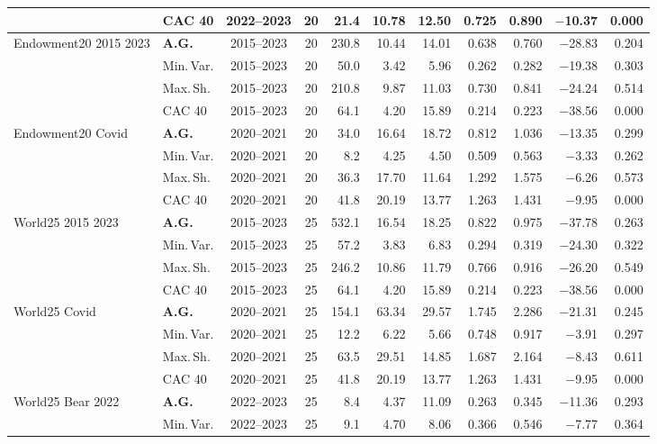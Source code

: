 \begin{longtable}{p{2.6cm} l c c r r r r r r r}
 & CAC 40 & 2022--2023 & 20 & 21.4 & 10.78 & 12.50 & 0.725 & 0.890 & $-$10.37 & 0.000 \\
\midrule
Endowment20 2015 2023 & \textbf{A.G.} & 2015--2023 & 20 & 230.8 & 10.44 & 14.01 & 0.638 & 0.760 & $-$28.83 & 0.204 \\
 & Min.\,Var. & 2015--2023 & 20 & 50.0 & 3.42 & 5.96 & 0.262 & 0.282 & $-$19.38 & 0.303 \\
 & Max.\,Sh. & 2015--2023 & 20 & 210.8 & 9.87 & 11.03 & 0.730 & 0.841 & $-$24.24 & 0.514 \\
 & CAC 40 & 2015--2023 & 20 & 64.1 & 4.20 & 15.89 & 0.214 & 0.223 & $-$38.56 & 0.000 \\
\midrule
Endowment20 Covid & \textbf{A.G.} & 2020--2021 & 20 & 34.0 & 16.64 & 18.72 & 0.812 & 1.036 & $-$13.35 & 0.299 \\
 & Min.\,Var. & 2020--2021 & 20 & 8.2 & 4.25 & 4.50 & 0.509 & 0.563 & $-$3.33 & 0.262 \\
 & Max.\,Sh. & 2020--2021 & 20 & 36.3 & 17.70 & 11.64 & 1.292 & 1.575 & $-$6.26 & 0.573 \\
 & CAC 40 & 2020--2021 & 20 & 41.8 & 20.19 & 13.77 & 1.263 & 1.431 & $-$9.95 & 0.000 \\
\midrule
World25 2015 2023 & \textbf{A.G.} & 2015--2023 & 25 & 532.1 & 16.54 & 18.25 & 0.822 & 0.975 & $-$37.78 & 0.263 \\
 & Min.\,Var. & 2015--2023 & 25 & 57.2 & 3.83 & 6.83 & 0.294 & 0.319 & $-$24.30 & 0.322 \\
 & Max.\,Sh. & 2015--2023 & 25 & 246.2 & 10.86 & 11.79 & 0.766 & 0.916 & $-$26.20 & 0.549 \\
 & CAC 40 & 2015--2023 & 25 & 64.1 & 4.20 & 15.89 & 0.214 & 0.223 & $-$38.56 & 0.000 \\
\midrule
World25 Covid & \textbf{A.G.} & 2020--2021 & 25 & 154.1 & 63.34 & 29.57 & 1.745 & 2.286 & $-$21.31 & 0.245 \\
 & Min.\,Var. & 2020--2021 & 25 & 12.2 & 6.22 & 5.66 & 0.748 & 0.917 & $-$3.91 & 0.297 \\
 & Max.\,Sh. & 2020--2021 & 25 & 63.5 & 29.51 & 14.85 & 1.687 & 2.164 & $-$8.43 & 0.611 \\
 & CAC 40 & 2020--2021 & 25 & 41.8 & 20.19 & 13.77 & 1.263 & 1.431 & $-$9.95 & 0.000 \\
\midrule
World25 Bear 2022 & \textbf{A.G.} & 2022--2023 & 25 & 8.4 & 4.37 & 11.09 & 0.263 & 0.345 & $-$11.36 & 0.293 \\
 & Min.\,Var. & 2022--2023 & 25 & 9.1 & 4.70 & 8.06 & 0.366 & 0.546 & $-$7.77 & 0.364 \\

\end{longtable}
